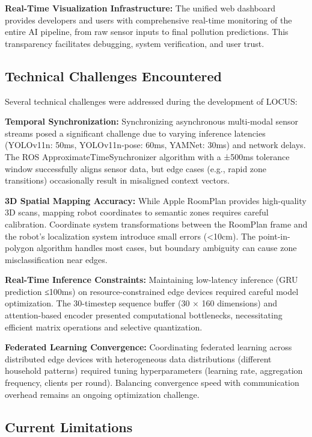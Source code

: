 \documentclass[conference]{IEEEtran}
\begin{document}
\textbf{Real-Time Visualization Infrastructure:} The unified web dashboard provides developers and users with comprehensive real-time monitoring of the entire AI pipeline, from raw sensor inputs to final pollution predictions. This transparency facilitates debugging, system verification, and user trust.

\subsection{Technical Challenges Encountered}

Several technical challenges were addressed during the development of LOCUS:

\textbf{Temporal Synchronization:} Synchronizing asynchronous multi-modal sensor streams posed a significant challenge due to varying inference latencies (YOLOv11n: 50ms, YOLOv11n-pose: 60ms, YAMNet: 30ms) and network delays. The ROS ApproximateTimeSynchronizer algorithm with a ±500ms tolerance window successfully aligns sensor data, but edge cases (e.g., rapid zone transitions) occasionally result in misaligned context vectors.

\textbf{3D Spatial Mapping Accuracy:} While Apple RoomPlan provides high-quality 3D scans, mapping robot coordinates to semantic zones requires careful calibration. Coordinate system transformations between the RoomPlan frame and the robot's localization system introduce small errors (<10cm). The point-in-polygon algorithm handles most cases, but boundary ambiguity can cause zone misclassification near edges.

\textbf{Real-Time Inference Constraints:} Maintaining low-latency inference (GRU prediction ≤100ms) on resource-constrained edge devices required careful model optimization. The 30-timestep sequence buffer (30 × 160 dimensions) and attention-based encoder presented computational bottlenecks, necessitating efficient matrix operations and selective quantization.

\textbf{Federated Learning Convergence:} Coordinating federated learning across distributed edge devices with heterogeneous data distributions (different household patterns) required tuning hyperparameters (learning rate, aggregation frequency, clients per round). Balancing convergence speed with communication overhead remains an ongoing optimization challenge.

\subsection{Current Limitations}
\end{document}
